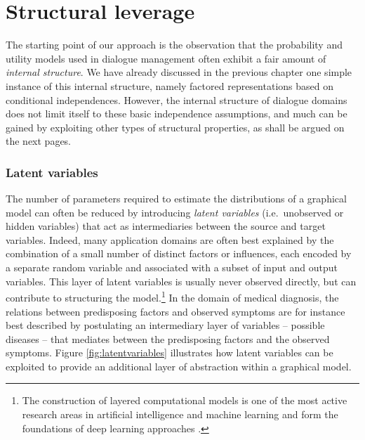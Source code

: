\section{Structural leverage}
\label{sec:rmotivation}

The starting point of our approach is the observation that the probability and utility models used in dialogue management often exhibit a fair amount of \textit{internal structure}.  
We have already discussed in the previous chapter one simple instance of this internal structure, namely factored representations based on conditional independences. However, the internal structure of dialogue domains does not limit itself to these basic independence assumptions, and much can be gained by exploiting other types of structural properties, as shall be argued on the next pages. 



\subsubsection*{Latent variables}
The number of parameters required to estimate the distributions of a graphical model can often be reduced by introducing \textit{latent variables} (i.e.\ unobserved or hidden variables) that act as intermediaries between the source and target variables. Indeed, many application domains are often best explained by the combination of a small number of distinct factors or influences, each encoded by a separate random variable and associated with a subset of input and output variables. This layer of latent variables is usually never observed directly, but can contribute to structuring the model.\footnote{The construction of layered computational models is one of the most active research areas in artificial intelligence and machine learning and form the foundations of deep learning approaches \citep{Bengio:2009}.} In the domain of medical diagnosis, the relations between predisposing factors and observed symptoms are for instance best described by postulating an intermediary layer of variables -- possible diseases -- that mediates between the predisposing factors and the observed symptoms.  Figure \ref{fig:latentvariables} illustrates how latent variables can be exploited to provide an additional layer of abstraction within a graphical model.

